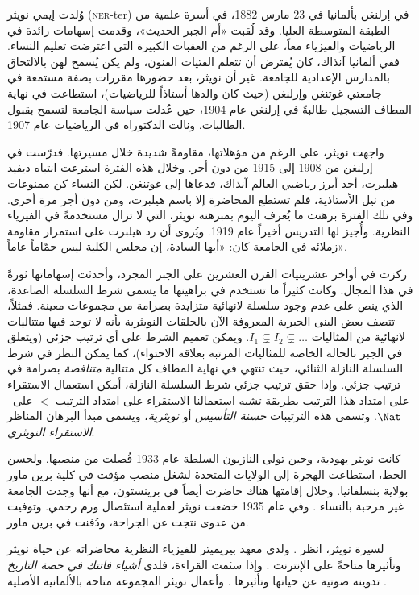 \documentclass[../../../include/open-logic-section]{subfiles}
\begin{document}



وُلدت إيمي نويثر (\textsc{ner}-ter) في إرلنغن بألمانيا في 23 مارس 1882،
في أسرة علمية من الطبقة المتوسطة العليا. وقد لُقبت «أم الجبر الحديث»،
وقدمت إسهامات رائدة في الرياضيات والفيزياء معاً، على الرغم من العقبات
الكبيرة التي اعترضت تعليم النساء. ففي ألمانيا آنذاك، كان يُفترض أن تتعلم
الفتيات الفنون، ولم يكن يُسمح لهن بالالتحاق بالمدارس الإعدادية للجامعة.
غير أن نويثر، بعد حضورها مقررات بصفة مستمعة في جامعتي غوتنغن وإرلنغن
(حيث كان والدها أستاذاً للرياضيات)، استطاعت في نهاية المطاف التسجيل طالبةً
في إرلنغن عام 1904، حين عُدلت سياسة الجامعة لتسمح بقبول الطالبات. ونالت
الدكتوراه في الرياضيات عام 1907.

واجهت نويثر، على الرغم من مؤهلاتها، مقاومةً شديدة خلال مسيرتها. فدرّست في
إرلنغن من 1908 إلى 1915 من دون أجر. وخلال هذه الفترة استرعت انتباه ديفيد
هيلبرت، أحد أبرز رياضيي العالم آنذاك، فدعاها إلى غوتنغن. لكن النساء كن
ممنوعات من نيل الأستاذية، فلم تستطع المحاضرة إلا باسم هيلبرت، ومن دون أجر
مرة أخرى. وفي تلك الفترة برهنت ما يُعرف اليوم بمبرهنة نويثر، التي لا تزال
مستخدمةً في الفيزياء النظرية. وأُجيز لها التدريس أخيراً عام 1919. ويُروى
أن رد هيلبرت على استمرار مقاومة زملائه في الجامعة كان: «أيها السادة، إن
مجلس الكلية ليس حمّاماً عاماً».

ركزت في أواخر عشرينيات القرن العشرين على الجبر المجرد، وأحدثت إسهاماتها
ثورةً في هذا المجال. وكانت كثيراً ما تستخدم في براهينها ما يسمى شرط
السلسلة الصاعدة، الذي ينص على عدم وجود سلسلة لانهائية متزايدة بصرامة من
مجموعات معينة. فمثلاً، تتصف بعض البنى الجبرية المعروفة الآن بالحلقات
النويثرية بأنه لا توجد فيها متتاليات لانهائية من المثاليات
$I_1 \subsetneq I_2 \subsetneq \dots$. ويمكن تعميم الشرط على أي ترتيب
جزئي (ويتعلق في الجبر بالحالة الخاصة للمثاليات المرتبة بعلاقة الاحتواء)،
كما يمكن النظر في شرط السلسلة النازلة الثنائي، حيث تنتهي في نهاية المطاف
كل متتالية \emph{متناقصة} بصرامة في ترتيب جزئي. وإذا حقق ترتيب جزئي شرط
السلسلة النازلة، أمكن استعمال الاستقراء على امتداد هذا الترتيب بطريقة
تشبه استعمالنا الاستقراء على امتداد الترتيب $<$ على~$\Nat$. وتسمى هذه
الترتيبات \emph{حسنة التأسيس} أو \emph{نويثرية}، ويسمى مبدأ البرهان
المناظر \emph{الاستقراء النويثري}.

كانت نويثر يهودية، وحين تولى النازيون السلطة عام 1933 فُصلت من منصبها.
ولحسن الحظ، استطاعت الهجرة إلى الولايات المتحدة لشغل منصب مؤقت في كلية
برين ماور بولاية بنسلفانيا. وخلال إقامتها هناك حاضرت أيضاً في برينستون،
مع أنها وجدت الجامعة غير مرحبة بالنساء \citep[81]{Dick1981}. وفي عام
1935 خضعت نويثر لعملية استئصال ورم رحمي. وتوفيت من عدوى نتجت عن الجراحة،
ودُفنت في برين ماور.

\begin{reading}
لسيرة نويثر، انظر \citet{Dick1981}. ولدى معهد بيريميتر للفيزياء النظرية
محاضراته عن حياة نويثر وتأثيرها متاحةً على الإنترنت
\citep{Perimeter2015}. وإذا سئمت القراءة، فلدى \emph{أشياء فاتتك في حصة
التاريخ} تدوينة صوتية عن حياتها وتأثيرها \citep{Frey2015}. وأعمال نويثر
المجموعة متاحة بالألمانية الأصلية \citep{Noether1983}.
\end{reading}
\end{document}
